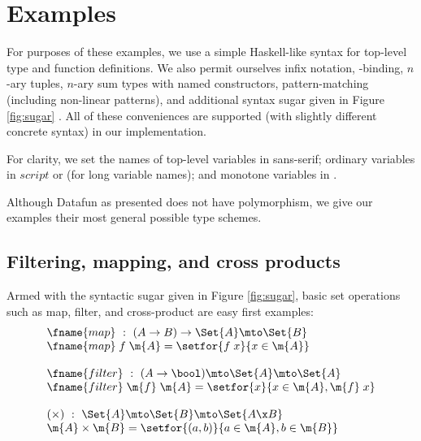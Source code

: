 
\section{Examples}

For purposes of these examples, we use a simple Haskell-like syntax for
top-level type and function definitions. We also permit ourselves infix
notation, -binding, $n$-ary tuples, $n$-ary sum types with named
constructors, pattern-matching (including non-linear patterns), and
additional syntax sugar given in Figure \ref{fig:sugar} . All of these conveniences are supported (with
slightly different concrete syntax) in our implementation.

For clarity, we set the names of top-level variables in \textsf{sans-serif};
ordinary variables in $script$ or  (for long variable names); and
monotone variables in .

Although Datafun as presented does not have polymorphism, we give our examples
their most general possible type schemes.



\subsection{Filtering, mapping, and cross products}

Armed with the syntactic sugar given in Figure \ref{fig:sugar}, basic set
operations such as map, filter, and cross-product are easy first examples:
\[\begin{array}{l}
\fname{map} ~:~ (A \uto B) \uto \Set{A} \mto \Set{B}\\
\fname{map}\;f\;\m{A} = \setfor{f\;x}{x \in \m{A}}\\
\\
\fname{filter} ~:~ (A \uto \bool) \mto \Set{A} \mto \Set{A}\\
\fname{filter}\;\m{f}\;\m{A} = \setfor{x}{x \in \m{A}, \m{f}\; x}\\
\\
(\times) ~:~ \Set{A} \mto \Set{B} \mto \Set{A \x B}\\
\m{A} \times \m{B} = \setfor{(a,b)}{a \in \m{A}, b \in \m{B}}
\end{array}\]

